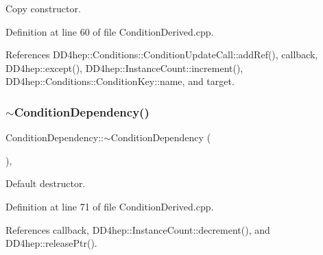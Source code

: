 Copy constructor. 



Definition at line 60 of file Condition\+Derived.\+cpp.



References D\+D4hep\+::\+Conditions\+::\+Condition\+Update\+Call\+::add\+Ref(), callback, D\+D4hep\+::except(), D\+D4hep\+::\+Instance\+Count\+::increment(), D\+D4hep\+::\+Conditions\+::\+Condition\+Key\+::name, and target.

\hypertarget{class_d_d4hep_1_1_conditions_1_1_condition_dependency_ae92b62f4f395a37f0acbf30f797ccdcd}{}\label{class_d_d4hep_1_1_conditions_1_1_condition_dependency_ae92b62f4f395a37f0acbf30f797ccdcd} 
\subsubsection{\texorpdfstring{$\sim$\+Condition\+Dependency()}{~ConditionDependency()}}
{\footnotesize\ttfamily Condition\+Dependency\+::$\sim$\+Condition\+Dependency (\begin{DoxyParamCaption}{ }\end{DoxyParamCaption})\hspace{0.3cm}{\ttfamily [protected]}, {\ttfamily [virtual]}}



Default destructor. 



Definition at line 71 of file Condition\+Derived.\+cpp.



References callback, D\+D4hep\+::\+Instance\+Count\+::decrement(), and D\+D4hep\+::release\+Ptr().

\hypertarget{class_d_d4hep_1_1_conditions_1_1_condition_dependency_aaf35fcc834e5ee49cc9d13fe9cff7ab5}{}\label{class_d_d4hep_1_1_conditions_1_1_condition_dependency_aaf35fcc834e5ee49cc9d13fe9cff7ab5} 
